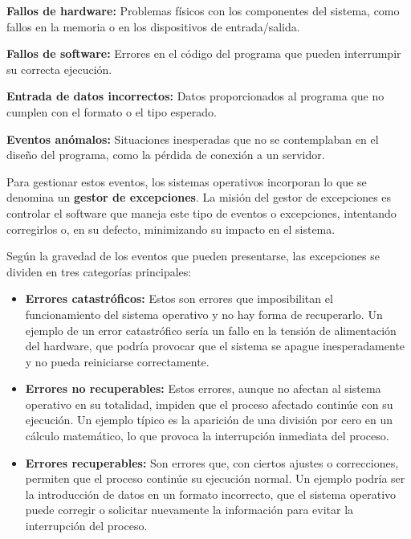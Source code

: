 \begin{itemize}
\end{itemize}

Para gestionar estos eventos, los sistemas operativos incorporan lo que se denomina un \textbf{gestor de excepciones}. La misión del gestor de excepciones es controlar el software que maneja este tipo de eventos o excepciones, intentando corregirlos o, en su defecto, minimizando su impacto en el sistema.

Según la gravedad de los eventos que pueden presentarse, las excepciones se dividen en tres categorías principales:

\begin{itemize}
	\item \textbf{Errores catastróficos:} 
	Estos son errores que imposibilitan el funcionamiento del sistema operativo y no hay forma de recuperarlo. Un ejemplo de un error catastrófico sería un fallo en la tensión de alimentación del hardware, que podría provocar que el sistema se apague inesperadamente y no pueda reiniciarse correctamente.
	
	\item \textbf{Errores no recuperables:} 
	Estos errores, aunque no afectan al sistema operativo en su totalidad, impiden que el proceso afectado continúe con su ejecución. Un ejemplo típico es la aparición de una división por cero en un cálculo matemático, lo que provoca la interrupción inmediata del proceso.
	
	\item \textbf{Errores recuperables:} 
	Son errores que, con ciertos ajustes o correcciones, permiten que el proceso continúe su ejecución normal. Un ejemplo podría ser la introducción de datos en un formato incorrecto, que el sistema operativo puede corregir o solicitar nuevamente la información para evitar la interrupción del proceso.
\end{itemize}


